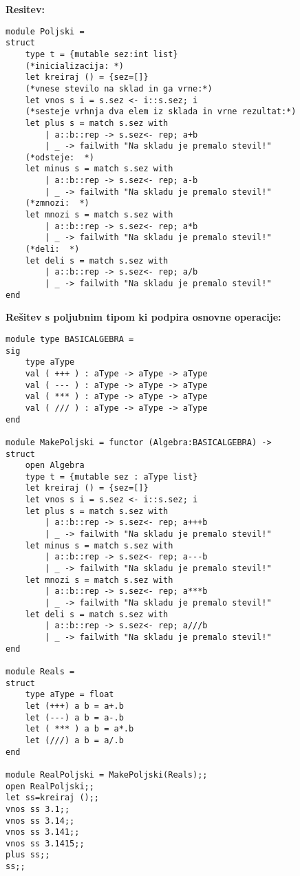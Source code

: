 \begin{Odgovor}{5.6}

\textbf{Resitev:}
\begin{lstlisting}
module Poljski =
struct
    type t = {mutable sez:int list}
    (*inicializacija: *)
    let kreiraj () = {sez=[]}
    (*vnese stevilo na sklad in ga vrne:*)
    let vnos s i = s.sez <- i::s.sez; i
    (*sesteje vrhnja dva elem iz sklada in vrne rezultat:*)
    let plus s = match s.sez with
        | a::b::rep -> s.sez<- rep; a+b
        | _ -> failwith "Na skladu je premalo stevil!"
    (*odsteje:  *)
    let minus s = match s.sez with
        | a::b::rep -> s.sez<- rep; a-b
        | _ -> failwith "Na skladu je premalo stevil!"
    (*zmnozi:  *)
    let mnozi s = match s.sez with
        | a::b::rep -> s.sez<- rep; a*b
        | _ -> failwith "Na skladu je premalo stevil!"
    (*deli:  *)
    let deli s = match s.sez with
        | a::b::rep -> s.sez<- rep; a/b
        | _ -> failwith "Na skladu je premalo stevil!"
end
\end{lstlisting}
\textbf{Re\v sitev s poljubnim tipom ki podpira osnovne operacije:}
\begin{lstlisting}
module type BASICALGEBRA =
sig
    type aType
    val ( +++ ) : aType -> aType -> aType
    val ( --- ) : aType -> aType -> aType
    val ( *** ) : aType -> aType -> aType
    val ( /// ) : aType -> aType -> aType
end

module MakePoljski = functor (Algebra:BASICALGEBRA) ->
struct
    open Algebra
    type t = {mutable sez : aType list}
    let kreiraj () = {sez=[]}
    let vnos s i = s.sez <- i::s.sez; i
    let plus s = match s.sez with
        | a::b::rep -> s.sez<- rep; a+++b
        | _ -> failwith "Na skladu je premalo stevil!"
    let minus s = match s.sez with
        | a::b::rep -> s.sez<- rep; a---b
        | _ -> failwith "Na skladu je premalo stevil!"
    let mnozi s = match s.sez with
        | a::b::rep -> s.sez<- rep; a***b
        | _ -> failwith "Na skladu je premalo stevil!"
    let deli s = match s.sez with
        | a::b::rep -> s.sez<- rep; a///b
        | _ -> failwith "Na skladu je premalo stevil!"
end

module Reals =
struct
    type aType = float
    let (+++) a b = a+.b
    let (---) a b = a-.b
    let ( *** ) a b = a*.b
    let (///) a b = a/.b
end

module RealPoljski = MakePoljski(Reals);;
open RealPoljski;;
let ss=kreiraj ();;
vnos ss 3.1;;
vnos ss 3.14;;
vnos ss 3.141;;
vnos ss 3.1415;;
plus ss;;
ss;;
\end{lstlisting}

\end{Odgovor}
